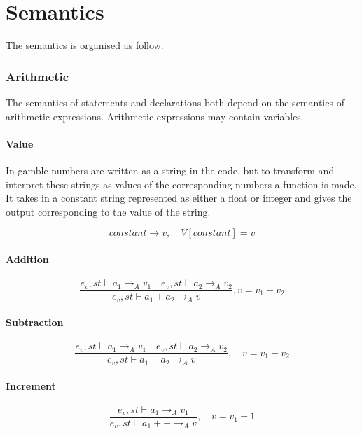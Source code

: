\chapter{Semantics}\label{app:semantics}
The semantics is organised as follow:

\subsection*{Arithmetic}
The semantics of statements and declarations both depend on the semantics of arithmetic expressions.
Arithmetic expressions may contain variables.

\subsubsection{Value}
In \gls{gamble} numbers are written as a string in the code, but to transform and interpret these strings as values of the corresponding numbers a function is made.
It takes in a constant string represented as either a float or integer and gives the output corresponding to the value of the string.

\begin{equation}
constant\rightarrow v,\quad V[constant]=v
\end{equation}

\subsubsection{Addition}
\begin{equation}
	\frac { { e }_{ v },st\vdash { a }_{ 1 }{ \rightarrow  }_{ A }{ v }_{ 1 }\quad { e }_{ v },st\vdash { a }_{ 2 }{ \rightarrow  }_{ A }{ v }_{ 2 } }{ { e }_{ v },st\vdash { a }_{ 1 }+{ a }_{ 2 }{ \rightarrow  }_{ A }{ v } } , v = { v }_{ 1 }+{ v }_{ 2 }
\end{equation}

\subsubsection{Subtraction}
\begin{equation}
	\frac { { e }_{ v },st\vdash { a }_{ 1 }{ \rightarrow  }_{ A }{ v }_{ 1 }\quad { e }_{ v },st\vdash { a }_{ 2 }{ \rightarrow  }_{ A }{ v }_{ 2 } }{ { e }_{ v },st\vdash { a }_{ 1 }-{ a }_{ 2 }{ \rightarrow  }_{ A }{ v } } ,\quad v={ v }_{ 1 }-{ v }_{ 2 }
\end{equation}

\subsubsection{Increment}
\begin{equation}
\frac { { e }_{ v },st\vdash { a }_{ 1 }{ \rightarrow  }_{ A }{ v }_{ 1 } }{ { e }_{ v },st\vdash { a }_{ 1 }++{ \rightarrow  }_{ A }{ v } } ,\quad v={ v }_{ 1 }+1
\end{equation}

